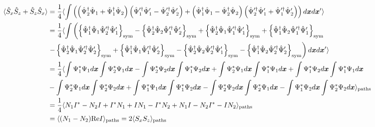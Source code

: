 \begin{equation*}
\begin{split}
	\langle \hat{S}_x \hat{S}_z + \hat{S}_z \hat{S}_x \rangle
	& = \frac{1}{4} \langle \int \left(
		\left(
			\hat{\Psi}^\dagger_2 \hat{\Psi}_1 + \hat{\Psi}^\dagger_1 \hat{\Psi}_2
		\right)
		\left(
			\hat{\Psi}^{\prime\dagger}_1 \hat{\Psi}^\prime_1 - \hat{\Psi}^{\prime\dagger}_2 \hat{\Psi}^\prime_2
		\right)
		+ \left(
			\hat{\Psi}^\dagger_1 \hat{\Psi}_1 - \hat{\Psi}^\dagger_2 \hat{\Psi}_2
		\right)
		\left(
			\hat{\Psi}^{\prime\dagger}_2 \hat{\Psi}^\prime_1 + \hat{\Psi}^{\prime\dagger}_1 \hat{\Psi}^\prime_2
		\right)
	\right) d\boldsymbol{x} d\boldsymbol{x}^\prime \rangle \\
	& = \frac{1}{4} \langle \int \left(
		\left\{  \hat{\Psi}^\dagger_1 \hat{\Psi}_1 \hat{\Psi}^{\prime\dagger}_2 \hat{\Psi}^\prime_1  \right\}_{\mathrm{sym}}
		- \left\{  \hat{\Psi}^\dagger_2 \hat{\Psi}_2 \hat{\Psi}^{\prime\dagger}_1 \hat{\Psi}^\prime_2  \right\}_{\mathrm{sym}}
		+ \left\{  \hat{\Psi}^\dagger_2 \hat{\Psi}_1 \hat{\Psi}^{\prime\dagger}_1 \hat{\Psi}^\prime_1  \right\}_{\mathrm{sym}}
		+ \left\{  \hat{\Psi}^\dagger_1 \hat{\Psi}_2 \hat{\Psi}^{\prime\dagger}_1 \hat{\Psi}^\prime_1  \right\}_{\mathrm{sym}}
	\right. \\
	& \left.
		- \left\{  \hat{\Psi}^\dagger_2 \hat{\Psi}_1 \hat{\Psi}^{\prime\dagger}_2 \hat{\Psi}^\prime_2  \right\}_{\mathrm{sym}}
		+ \left\{  \hat{\Psi}^\dagger_1 \hat{\Psi}_1 \hat{\Psi}^{\prime\dagger}_1 \hat{\Psi}^\prime_2  \right\}_{\mathrm{sym}}
		- \left\{  \hat{\Psi}^\dagger_2 \hat{\Psi}_2 \hat{\Psi}^{\prime\dagger}_2 \hat{\Psi}^\prime_1  \right\}_{\mathrm{sym}}
		- \left\{  \hat{\Psi}^\dagger_1 \hat{\Psi}_2 \hat{\Psi}^{\prime\dagger}_2 \hat{\Psi}^\prime_2  \right\}_{\mathrm{sym}}
	\right) d\boldsymbol{x} d\boldsymbol{x}^\prime \rangle \\
	& = \frac{1}{4} \langle 
		\int \Psi^*_1 \Psi_1 d\boldsymbol{x} \int \Psi^*_2 \Psi_1 d\boldsymbol{x}
		- \int \Psi^*_2 \Psi_2 d\boldsymbol{x} \int \Psi^*_1 \Psi_2 d\boldsymbol{x}
		+ \int \Psi^*_2 \Psi_1 d\boldsymbol{x} \int \Psi^*_1 \Psi_1 d\boldsymbol{x}
		+ \int \Psi^*_1 \Psi_2 d\boldsymbol{x} \int \Psi^*_1 \Psi_1 d\boldsymbol{x} \\
	&	- \int \Psi^*_2 \Psi_1 d\boldsymbol{x} \int \Psi^*_2 \Psi_2 d\boldsymbol{x}
		+ \int \Psi^*_1 \Psi_1 d\boldsymbol{x} \int \Psi^*_1 \Psi_2 d\boldsymbol{x}
		- \int \Psi^*_2 \Psi_2 d\boldsymbol{x} \int \Psi^*_2 \Psi_1 d\boldsymbol{x}
		- \int \Psi^*_1 \Psi_2 d\boldsymbol{x} \int \Psi^*_2 \Psi_2 d\boldsymbol{x}
	 \rangle_{\mathrm{paths}} \\
	& = \frac{1}{4} \langle 
		N_1 I^*
		- N_2 I
		+ I^* N_1
		+ I N_1
		- I^* N_2
		+ N_1 I
		- N_2 I^*
		- I N_2
	 \rangle_{\mathrm{paths}} \\
	& = \langle  (N_1 - N_2) \mathrm{Re} I  \rangle_{\mathrm{paths}} = 2 \langle  S_x S_z  \rangle_{\mathrm{paths}}
\end{split}
\end{equation*}


